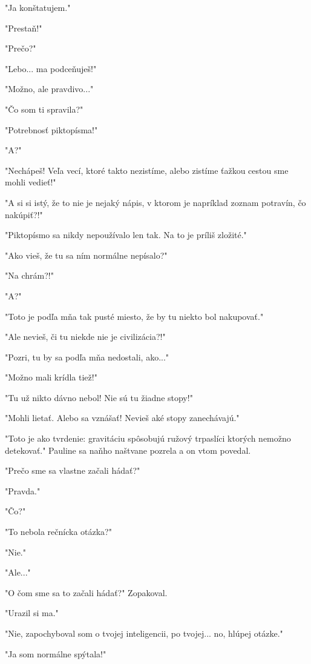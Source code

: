 \documentclass{book}
\begin{document}
"$ $Ja konštatujem."$ $ 

"$ $Prestaň!"$ $ 

"$ $Prečo?"$ $ 

"$ $Lebo... ma podceňuješ!"$ $ 

"$ $Možno, ale pravdivo..."$ $ 

"$ $Čo som ti spravila?"$ $ 

"$ $Potrebnosť piktopísma!"$ $ 

"$ $A?"$ $ 

"$ $Nechápeš! Veľa vecí, ktoré takto nezistíme, alebo zistíme ťažkou cestou sme mohli vedieť!"$ $ 

"$ $A si si istý, že to nie je nejaký nápis, v ktorom je napríklad zoznam potravín, čo nakúpiť?!"$ $ 

"$ $Piktopísmo sa nikdy nepoužívalo len tak. Na to je príliš zložité."$ $ 

"$ $Ako vieš, že tu sa ním normálne nepísalo?"$ $ 

"$ $Na chrám?!"$ $ 

"$ $A?"$ $ 

"$ $Toto je podľa mňa tak pusté miesto, že by tu niekto bol nakupovať."$ $ 

"$ $Ale nevieš, či tu niekde nie je civilizácia?!"$ $ 

"$ $Pozri, tu by sa podľa mňa nedostali, ako..."$ $ 

"$ $Možno mali krídla tiež!"$ $ 

"$ $Tu už nikto dávno nebol! Nie sú tu žiadne stopy!"$ $ 

"$ $Mohli lietať. Alebo sa vznášať! Nevieš aké stopy zanechávajú."$ $ 

"$ $Toto je ako tvrdenie: gravitáciu spôsobujú ružový trpaslíci ktorých nemožno detekovať."$ $  Pauline sa naňho naštvane pozrela a on vtom povedal.

"$ $Prečo sme sa vlastne začali hádať?"$ $ 

"$ $Pravda."$ $ 

"$ $Čo?"$ $ 

"$ $To nebola rečnícka otázka?"$ $ 

"$ $Nie."$ $ 

"$ $Ale..."$ $ 

"$ $O čom sme sa to začali hádať?"$ $  Zopakoval.

"$ $Urazil si ma."$ $ 

"$ $Nie, zapochyboval som o tvojej inteligencii, po tvojej... no, hlúpej otázke."$ $ 

"$ $Ja som normálne spýtala!"$ $ 
\end{document}
